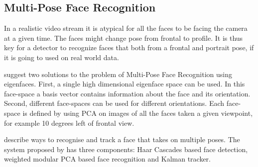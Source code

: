 \subsection{Multi-Pose Face Recognition}
  In a realistic video stream it is atypical for all the faces to be facing the camera at a given time.
  The faces might change pose from frontal to profile.
  It is thus key for a detector to recognize faces that both from a frontal and portrait pose, if it is going to used on real world data.

  \citeauthor{viewBasedFaceRecog} \cite{viewBasedFaceRecog} suggest two solutions to the problem of Multi-Pose Face Recognition using eigenfaces.
  First, a single high dimensional eigenface space can be used.
  In this face-space a basis vector contains information about the face and its orientation.
  Second, different face-spaces can be used for different orientations.
  Each face-space is defined by using PCA on images of all the faces taken a given viewpoint, for example 10 degrees left of frontal view.

  \citeauthor{PoseFaceRec} \cite{PoseFaceRec} describe ways to recognise and track a face that takes on multiple poses.
  The system proposed by \citeauthor{PoseFaceRec} has three components: Haar Cascades based face detection, weighted modular PCA based face recognition and Kalman tracker.
  
